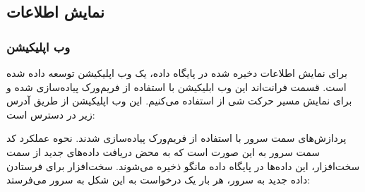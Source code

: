 \subsection{نمایش اطلاعات}
\subsubsection{وب اپلیکیشن}
برای نمایش اطلاعات دخیره شده در پایگاه داده، یک وب اپلیکیشن توسعه داده شده است. قسمت فرانت‌اند این وب ابلیکیشن با استفاده از فریم‌ورک  پیاده‌سازی شده و برای نمایش مسیر حرکت شی از  استفاده می‌کنیم. این وب اپلیکیشن از طریق آدرس زیر در دسترس است: \href{http://103.216.62.79}{}


پردازش‌های سمت سرور با استفاده از فریم‌ورک  پیاده‌سازی شدند. نحوه عملکرد کد سمت سرور به این صورت است که به محض دریافت داده‌های جدید از سمت سخت‌افزار، این داده‌ها در پایگاه داده مانگو ذخیره می‌شوند. سخت‌افزار برای فرستادن داده جدید به سرور، هر بار یک درخواست  به این شکل به سرور می‌فرستد: 



